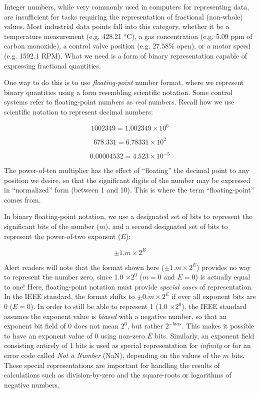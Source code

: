 Integer numbers, while very commonly used in computers for representing data, are insufficient for tasks requiring the representation of fractional (non-whole) values.  Most industrial data points fall into this category, whether it be a temperature measurement (e.g. 428.21 $^{o}$C), a gas concentration (e.g. 5.09 ppm of carbon monoxide), a control valve position (e.g. 27.58\% open), or a motor speed (e.g. 1592.1 RPM).  What we need is a form of binary representation capable of expressing fractional quantities.

One way to do this is to use \textit{floating-point} number format, where we represent binary quantities using a form resembling scientific notation.  Some control systems refer to floating-point numbers as \textit{real} numbers.  Recall how we use scientific notation to represent decimal numbers:   

$$1002349 = 1.002349 \times 10^{6}$$

$$678.331 = 6.78331 \times 10^{2}$$

$$0.00004532 = 4.523 \times 10^{-5}$$

The power-of-ten multiplier has the effect of ``floating'' the decimal point to any position we desire, so that the significant digits of the number may be expressed in ``normalized'' form (between 1 and 10).  This is where the term ``floating-point'' comes from.

In binary floating-point notation, we use a designated set of bits to represent the significant bits of the number ($m$), and a second designated set of bits to represent the power-of-two exponent ($E$):

$$\pm 1.m \times 2^{E}$$

Alert readers will note that the format shown here ($\pm 1.m \times 2^{E}$) provides no way to represent the number zero, since 1.0 $\times 2^0$ ($m = 0$ and $E = 0$) is actually equal to one!  Here, floating-point notation must provide \textit{special cases} of representation.  In the IEEE standard, the format shifts to $\pm 0.m \times 2^{E}$ if ever all exponent bits are 0 ($E = 0$).  In order to still be able to represent 1 (1.0 $\times 2^0$), the IEEE standard assumes the exponent value is \textit{biased} with a negative number, so that an exponent bit field of 0 does not mean $2^0$, but rather $2^{-bias}$.  This makes it possible to have an exponent value of 0 using non-zero $E$ bits.  Similarly, an exponent field consisting entirely of 1 bits is used as special representation for \textit{infinity} or for an error code called \textit{Not a Number} (NaN), depending on the values of the $m$ bits.  These special representations are important for handling the results of calculations such as division-by-zero and the square-roots or logarithms of negative numbers.    


